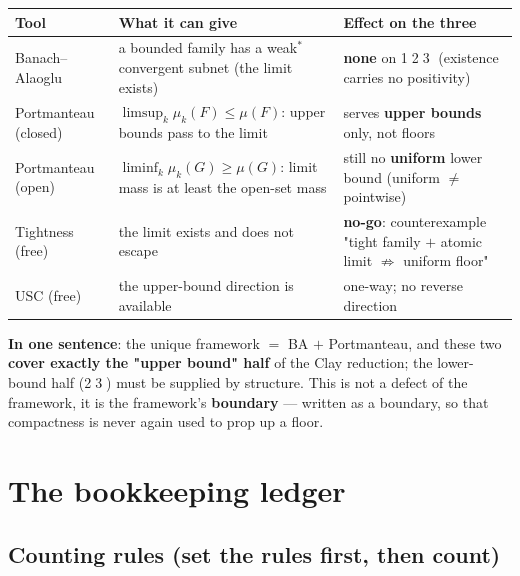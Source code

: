 \documentclass[11pt,a4paper]{article}
\newcommand{\lvNG}{\textcolor{cNG}{\textbf{no-go}}}
\begin{document}
\begin{center}
\small
\footnotesize
\begin{tabularx}{\textwidth}{@{}L{2.35cm}Y L{2.0cm}@{}}
\toprule
\textbf{Tool} & \textbf{What it can give} & \textbf{Effect on the three} \\
\midrule
Banach--Alaoglu & a bounded family has a weak$^\ast$ convergent subnet (the limit exists) & \textbf{none} on \textcircled{\small1}\textcircled{\small2}\textcircled{\small3} (existence carries no positivity)\\
Portmanteau (closed) & $\limsup_k\mu_k(F)\le\mu(F)$: upper bounds pass to the limit & serves \textbf{upper bounds} only, not floors \\
Portmanteau (open) & $\liminf_k\mu_k(G)\ge\mu(G)$: limit mass is at least the open-set mass & still no \textbf{uniform} lower bound (uniform $\ne$ pointwise)\\
Tightness (free) & the limit exists and does not escape & \lvNG: counterexample "tight family $+$ atomic limit $\not\Rightarrow$ uniform floor" \\
USC (free) & the upper-bound direction is available & one-way; no reverse direction \\
\bottomrule
\end{tabularx}
\end{center}

\noindent\textbf{In one sentence}: the unique framework $=$ BA $+$ Portmanteau, and these two \textbf{cover exactly the "upper bound" half} of the Clay reduction; the lower-bound half (\textcircled{\small2}\textcircled{\small3}) must be supplied by structure. This is not a defect of the framework, it is the framework's \textbf{boundary} --- written as a boundary, so that compactness is never again used to prop up a floor.

\section{The bookkeeping ledger}\label{sec:ledger}

\subsection{Counting rules (set the rules first, then count)}
\end{document}
